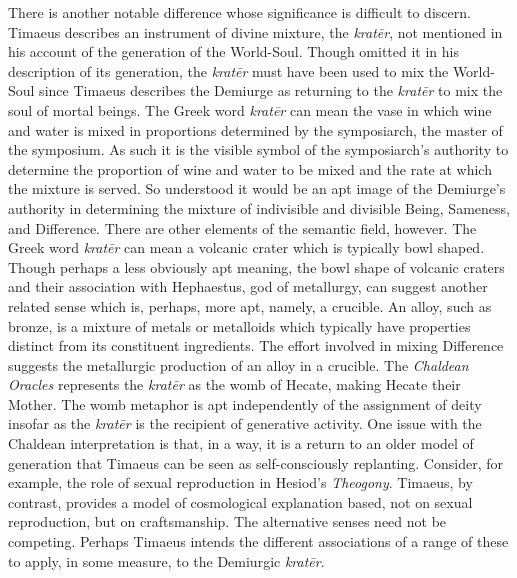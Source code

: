 
There is another notable difference whose significance is difficult to discern. Timae\-us describes an instrument of divine mixture, the \emph{kratēr}, not mentioned in his account of the generation of the World-Soul. Though omitted it in his description of its generation, the \emph{kratēr} must have been used to mix the World-Soul since Timaeus describes the Demiurge as returning to the \emph{kratēr} to mix the soul of mortal beings. The Greek word \emph{kratēr} can mean the vase in which wine and water is mixed in proportions determined by the symposiarch, the master of the symposium. As such it is the visible symbol of the symposiarch's authority to determine the proportion of wine and water to be mixed and the rate at which the mixture is served. So understood it would be an apt image of the Demiurge's authority in determining the mixture of indivisible and divisible Being, Sameness, and Difference. There are other elements of the semantic field, however. The Greek word \emph{kratēr} can mean a volcanic crater which is typically bowl shaped. Though perhaps a less obviously apt meaning, the bowl shape of volcanic craters and their association with Hephaestus, god of metallurgy, can suggest another related sense which is, perhaps, more apt, namely, a crucible. An alloy, such as bronze, is a mixture of metals or metalloids which typically have properties distinct from its constituent ingredients. The effort involved in mixing Difference suggests the metallurgic production of an alloy in a crucible. The \emph{Chaldean Oracles} represents the \emph{kratēr} as the womb of Hecate, making Hecate their Mother. The womb metaphor is apt independently of the assignment of deity insofar as the \emph{kratēr} is the recipient of generative activity. One issue with the Chaldean interpretation is that, in a way, it is a return to an older model of generation that Timaeus can be seen as self-consciously replanting. Consider, for example, the role of sexual reproduction in Hesiod's \emph{Theogony}. Timaeus, by contrast, provides a model of cosmological explanation based, not on sexual reproduction, but on craftsmanship. The alternative senses need not be competing. Perhaps Timaeus intends the different associations of a range of these to apply, in some measure, to the Demiurgic \emph{kratēr}.


